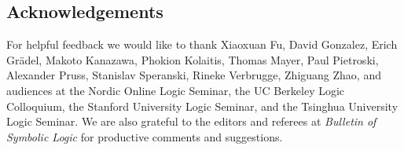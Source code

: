 \documentclass[12pt,oneside,reqno]{amsart}
\theoremstyle{definition}
\begin{document}
\subsection*{Acknowledgements} For helpful feedback we would like to thank Xiaoxuan Fu, David Gonzalez, Erich Gr\"{a}del, Makoto Kanazawa, Phokion Kolaitis, Thomas Mayer, Paul Pietroski, Alexander Pruss, Stanislav Speranski, Rineke Verbrugge, Zhiguang Zhao, and audiences at the Nordic Online Logic Seminar, the UC Berkeley Logic Colloquium, the Stanford University Logic Seminar, and the Tsinghua University Logic Seminar. We are also grateful to the editors and referees at \emph{Bulletin of Symbolic Logic} for productive comments and suggestions. 





\end{document}
